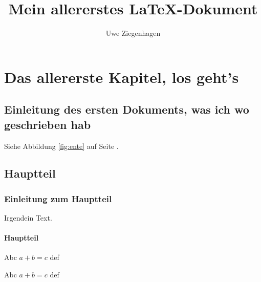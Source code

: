\documentclass[15pt,ngerman]{scrreprt}
\author{Uwe Ziegenhagen}
\title{Mein allererstes \LaTeX-Dokument}
\begin{document}
\maketitle

\tableofcontents

\listoffigures

\chapter{Das allererste Kapitel, los geht's}

\section{Einleitung des ersten Dokuments, was ich wo geschrieben hab}

\blindtext

Siehe Abbildung \ref{fig:ente} auf Seite \pageref{fig:ente}.

\section{Hauptteil}

\subsection{Einleitung zum Hauptteil}

Irgendein Text.

\subsubsection{Hauptteil}


\blindtext[2]

\blindtext[2]

Abc \( a + b = c\) def

Abc \( a + b = c\) def
\end{document}
